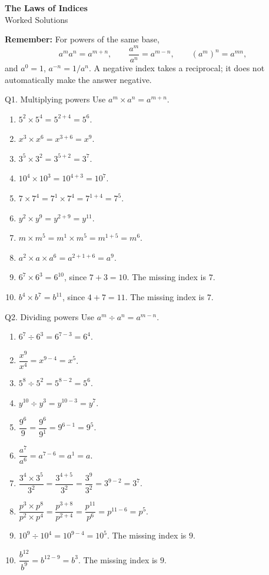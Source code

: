 \documentclass[12pt,a4paper]{article}
\begin{document}
\begin{center}
  {\Large\bfseries The Laws of Indices}\\[2pt]
  {\large Worked Solutions}
\end{center}

\begin{tcolorbox}[colback=orange!2,colframe=orange!60!black,boxrule=0.6pt]
\textbf{Remember:} For powers of the same base,
\[
a^m a^n=a^{m+n},\qquad \frac{a^m}{a^n}=a^{m-n},\qquad (a^m)^n=a^{mn},
\]
and \(a^0=1\), \(a^{-n}=1/a^n\). A negative index takes a reciprocal; it does not automatically make the answer negative.
\end{tcolorbox}

\begin{solution}{Q1. Multiplying powers}
Use \(a^m\times a^n=a^{m+n}\).
\begin{enumerate}[label=\textbf{(\alph*)}]
\item \(5^2\times5^4=5^{2+4}=5^6\).
\item \(x^3\times x^6=x^{3+6}=x^9\).
\item \(3^5\times3^2=3^{5+2}=3^7\).
\item \(10^4\times10^3=10^{4+3}=10^7\).
\item \(7\times7^4=7^1\times7^4=7^{1+4}=7^5\).
\item \(y^2\times y^9=y^{2+9}=y^{11}\).
\item \(m\times m^5=m^1\times m^5=m^{1+5}=m^6\).
\item \(a^2\times a\times a^6=a^{2+1+6}=a^9\).
\item \(6^7\times6^3=6^{10}\), since \(7+3=10\). The missing index is \(7\).
\item \(b^4\times b^7=b^{11}\), since \(4+7=11\). The missing index is \(7\).
\end{enumerate}
\end{solution}

\begin{solution}{Q2. Dividing powers}
Use \(a^m\div a^n=a^{m-n}\).
\begin{enumerate}[label=\textbf{(\alph*)}]
\item \(6^7\div6^3=6^{7-3}=6^4\).
\item \(\dfrac{x^9}{x^4}=x^{9-4}=x^5\).
\item \(5^8\div5^2=5^{8-2}=5^6\).
\item \(y^{10}\div y^3=y^{10-3}=y^7\).
\item \(\dfrac{9^6}{9}=\dfrac{9^6}{9^1}=9^{6-1}=9^5\).
\item \(\dfrac{a^7}{a^6}=a^{7-6}=a^1=a\).
\item \(\dfrac{3^4\times3^5}{3^2}=\dfrac{3^{4+5}}{3^2}=\dfrac{3^9}{3^2}=3^{9-2}=3^7\).
\item \(\dfrac{p^3\times p^8}{p^2\times p^4}=\dfrac{p^{3+8}}{p^{2+4}}=\dfrac{p^{11}}{p^6}=p^{11-6}=p^5\).
\item \(10^9\div10^4=10^{9-4}=10^5\). The missing index is \(9\).
\item \(\dfrac{b^{12}}{b^9}=b^{12-9}=b^3\). The missing index is \(9\).
\end{enumerate}
\end{solution}
\end{document}
